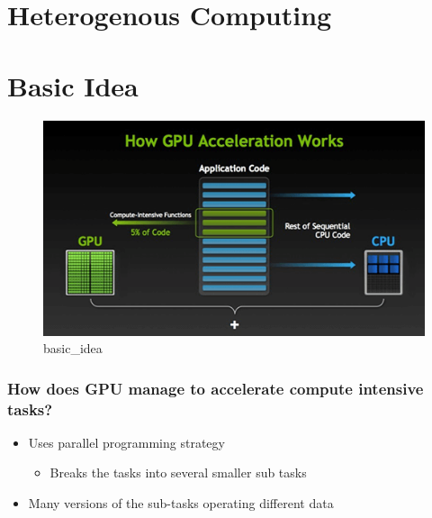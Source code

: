 \documentclass[11pt]{article}
\makeatletter
\def\maxwidth{\ifdim\Gin@nat@width>\linewidth\linewidth
    \else\Gin@nat@width\fi}
\let\Oldincludegraphics\includegraphics
\renewcommand{\includegraphics}[1]{\Oldincludegraphics[width=.8\maxwidth]{#1}}
\providecommand{\tightlist}{%
      \setlength{\itemsep}{0pt}\setlength{\parskip}{0pt}}
\makeatother
\begin{document}
    \section{Heterogenous Computing}\label{heterogenous-computing}

    \section{Basic Idea}\label{basic-idea}

\begin{figure}
\centering
\includegraphics{images/how-gpu-acceleration-works.png}
\caption{basic\_idea}
\end{figure}

    \subsubsection{How does GPU manage to accelerate compute intensive
tasks?}\label{how-does-gpu-manage-to-accelerate-compute-intensive-tasks}

    \begin{itemize}
\tightlist
\item
  Uses parallel programming strategy

  \begin{itemize}
  \tightlist
  \item
    Breaks the tasks into several smaller sub tasks
  \end{itemize}
\end{itemize}

    \begin{itemize}
\tightlist
\item
  Many versions of the sub-tasks operating different data
\end{itemize}
\end{document}
